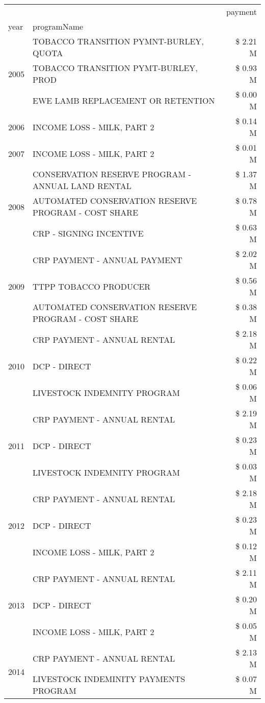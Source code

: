\begin{tabular}{llr}
\toprule
 &  & payment \\
year & programName &  \\
\midrule
\multirow[t]{3}{*}{2005} & TOBACCO TRANSITION PYMNT-BURLEY, QUOTA & \$ 2.21 M \\
 & TOBACCO TRANSITION PYMT-BURLEY, PROD & \$ 0.93 M \\
 & EWE LAMB REPLACEMENT OR RETENTION & \$ 0.00 M \\
\cline{1-3}
2006 & INCOME LOSS - MILK, PART 2 & \$ 0.14 M \\
\cline{1-3}
2007 & INCOME LOSS - MILK, PART 2 & \$ 0.01 M \\
\cline{1-3}
\multirow[t]{3}{*}{2008} & CONSERVATION RESERVE PROGRAM - ANNUAL LAND RENTAL & \$ 1.37 M \\
 & AUTOMATED CONSERVATION RESERVE PROGRAM - COST SHARE & \$ 0.78 M \\
 & CRP - SIGNING INCENTIVE & \$ 0.63 M \\
\cline{1-3}
\multirow[t]{3}{*}{2009} & CRP PAYMENT - ANNUAL PAYMENT & \$ 2.02 M \\
 & TTPP TOBACCO PRODUCER & \$ 0.56 M \\
 & AUTOMATED CONSERVATION RESERVE PROGRAM - COST SHARE & \$ 0.38 M \\
\cline{1-3}
\multirow[t]{3}{*}{2010} & CRP PAYMENT - ANNUAL RENTAL & \$ 2.18 M \\
 & DCP - DIRECT & \$ 0.22 M \\
 & LIVESTOCK INDEMNITY PROGRAM & \$ 0.06 M \\
\cline{1-3}
\multirow[t]{3}{*}{2011} & CRP PAYMENT - ANNUAL RENTAL & \$ 2.19 M \\
 & DCP - DIRECT & \$ 0.23 M \\
 & LIVESTOCK INDEMNITY PROGRAM & \$ 0.03 M \\
\cline{1-3}
\multirow[t]{3}{*}{2012} & CRP PAYMENT - ANNUAL RENTAL & \$ 2.18 M \\
 & DCP - DIRECT & \$ 0.23 M \\
 & INCOME LOSS - MILK, PART 2 & \$ 0.12 M \\
\cline{1-3}
\multirow[t]{3}{*}{2013} & CRP PAYMENT - ANNUAL RENTAL & \$ 2.11 M \\
 & DCP - DIRECT & \$ 0.20 M \\
 & INCOME LOSS - MILK, PART 2 & \$ 0.05 M \\
\cline{1-3}
\multirow[t]{3}{*}{2014} & CRP PAYMENT - ANNUAL RENTAL & \$ 2.13 M \\
 & LIVESTOCK INDEMINITY PAYMENTS PROGRAM & \$ 0.07 M \\

\end{tabular}
